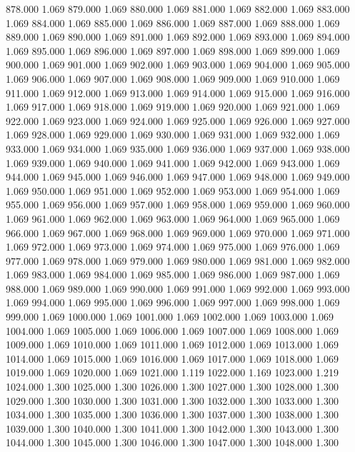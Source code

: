 878.000 1.069 
879.000 1.069 
880.000 1.069 
881.000 1.069 
882.000 1.069 
883.000 1.069 
884.000 1.069 
885.000 1.069 
886.000 1.069 
887.000 1.069 
888.000 1.069 
889.000 1.069 
890.000 1.069 
891.000 1.069 
892.000 1.069 
893.000 1.069 
894.000 1.069 
895.000 1.069 
896.000 1.069 
897.000 1.069 
898.000 1.069 
899.000 1.069 
900.000 1.069 
901.000 1.069 
902.000 1.069 
903.000 1.069 
904.000 1.069 
905.000 1.069 
906.000 1.069 
907.000 1.069 
908.000 1.069 
909.000 1.069 
910.000 1.069 
911.000 1.069 
912.000 1.069 
913.000 1.069 
914.000 1.069 
915.000 1.069 
916.000 1.069 
917.000 1.069 
918.000 1.069 
919.000 1.069 
920.000 1.069 
921.000 1.069 
922.000 1.069 
923.000 1.069 
924.000 1.069 
925.000 1.069 
926.000 1.069 
927.000 1.069 
928.000 1.069 
929.000 1.069 
930.000 1.069 
931.000 1.069 
932.000 1.069 
933.000 1.069 
934.000 1.069 
935.000 1.069 
936.000 1.069 
937.000 1.069 
938.000 1.069 
939.000 1.069 
940.000 1.069 
941.000 1.069 
942.000 1.069 
943.000 1.069 
944.000 1.069 
945.000 1.069 
946.000 1.069 
947.000 1.069 
948.000 1.069 
949.000 1.069 
950.000 1.069 
951.000 1.069 
952.000 1.069 
953.000 1.069 
954.000 1.069 
955.000 1.069 
956.000 1.069 
957.000 1.069 
958.000 1.069 
959.000 1.069 
960.000 1.069 
961.000 1.069 
962.000 1.069 
963.000 1.069 
964.000 1.069 
965.000 1.069 
966.000 1.069 
967.000 1.069 
968.000 1.069 
969.000 1.069 
970.000 1.069 
971.000 1.069 
972.000 1.069 
973.000 1.069 
974.000 1.069 
975.000 1.069 
976.000 1.069 
977.000 1.069 
978.000 1.069 
979.000 1.069 
980.000 1.069 
981.000 1.069 
982.000 1.069 
983.000 1.069 
984.000 1.069 
985.000 1.069 
986.000 1.069 
987.000 1.069 
988.000 1.069 
989.000 1.069 
990.000 1.069 
991.000 1.069 
992.000 1.069 
993.000 1.069 
994.000 1.069 
995.000 1.069 
996.000 1.069 
997.000 1.069 
998.000 1.069 
999.000 1.069 
1000.000 1.069 
1001.000 1.069 
1002.000 1.069 
1003.000 1.069 
1004.000 1.069 
1005.000 1.069 
1006.000 1.069 
1007.000 1.069 
1008.000 1.069 
1009.000 1.069 
1010.000 1.069 
1011.000 1.069 
1012.000 1.069 
1013.000 1.069 
1014.000 1.069 
1015.000 1.069 
1016.000 1.069 
1017.000 1.069 
1018.000 1.069 
1019.000 1.069 
1020.000 1.069 
1021.000 1.119 
1022.000 1.169 
1023.000 1.219 
1024.000 1.300 
1025.000 1.300 
1026.000 1.300 
1027.000 1.300 
1028.000 1.300 
1029.000 1.300 
1030.000 1.300 
1031.000 1.300 
1032.000 1.300 
1033.000 1.300 
1034.000 1.300 
1035.000 1.300 
1036.000 1.300 
1037.000 1.300 
1038.000 1.300 
1039.000 1.300 
1040.000 1.300 
1041.000 1.300 
1042.000 1.300 
1043.000 1.300 
1044.000 1.300 
1045.000 1.300 
1046.000 1.300 
1047.000 1.300 
1048.000 1.300 
